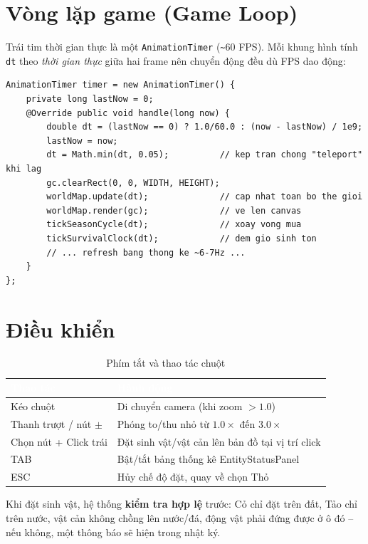 \documentclass[12pt,a4paper]{report}
\newcommand{\code}[1]{\texttt{\small #1}}
\begin{document}
\section{Vòng lặp game (Game Loop)}

Trái tim thời gian thực là một \code{AnimationTimer} (\code{\textasciitilde}60 FPS). Mỗi khung hình tính \code{dt} theo \textit{thời gian thực} giữa hai frame nên chuyển động đều dù FPS dao động:

\begin{lstlisting}[caption={Vòng lặp chính trong MainApp}]
AnimationTimer timer = new AnimationTimer() {
    private long lastNow = 0;
    @Override public void handle(long now) {
        double dt = (lastNow == 0) ? 1.0/60.0 : (now - lastNow) / 1e9;
        lastNow = now;
        dt = Math.min(dt, 0.05);          // kep tran chong "teleport" khi lag
        gc.clearRect(0, 0, WIDTH, HEIGHT);
        worldMap.update(dt);              // cap nhat toan bo the gioi
        worldMap.render(gc);              // ve len canvas
        tickSeasonCycle(dt);              // xoay vong mua
        tickSurvivalClock(dt);            // dem gio sinh ton
        // ... refresh bang thong ke ~6-7Hz ...
    }
};
\end{lstlisting}

\section{Điều khiển}

\begin{table}[H]
\centering
\caption{Phím tắt và thao tác chuột}
\begin{tabular}{L{4cm} L{8cm}}
\toprule
{}
\textcolor{white}{\textbf{Thao tác}} & \textcolor{white}{\textbf{Hành động}} \\
\midrule
Kéo chuột & Di chuyển camera (khi zoom $>1.0$) \\
 Thanh trượt / nút $\pm$ & Phóng to/thu nhỏ từ $1.0\times$ đến $3.0\times$ \\
Chọn nút + Click trái & Đặt sinh vật/vật cản lên bản đồ tại vị trí click \\
 TAB & Bật/tắt bảng thống kê EntityStatusPanel \\
ESC & Hủy chế độ đặt, quay về chọn Thỏ \\
\bottomrule
\end{tabular}
\end{table}

Khi đặt sinh vật, hệ thống \textbf{kiểm tra hợp lệ} trước: Cỏ chỉ đặt trên đất, Tảo chỉ trên nước, vật cản không chồng lên nước/đá, động vật phải đứng được ở ô đó -- nếu không, một thông báo sẽ hiện trong nhật ký.
\end{document}
